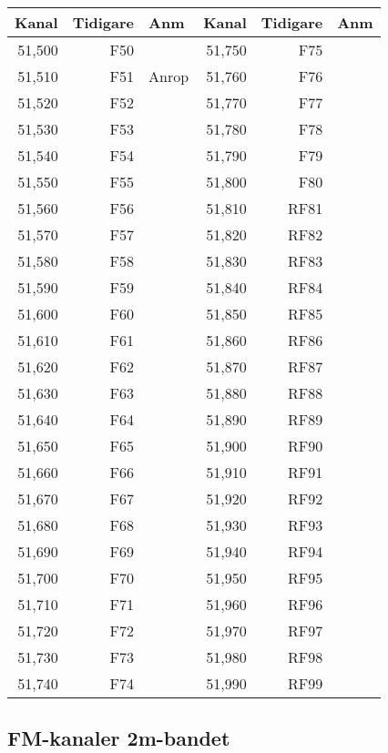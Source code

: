 \begin{longtable}{rrl|rrl}
\textbf{Kanal} & \textbf{Tidigare} & \textbf{Anm}
&  \textbf{Kanal} & \textbf{Tidigare} & \textbf{Anm} \\ \hline
	51,500 &      F50 &       & 51,750 &      F75 &  \\
	51,510 &      F51 & Anrop & 51,760 &      F76 &  \\
	51,520 &      F52 &       & 51,770 &      F77 &  \\
	51,530 &      F53 &       & 51,780 &      F78 &  \\
	51,540 &      F54 &       & 51,790 &      F79 &  \\
	51,550 &      F55 &       & 51,800 &      F80 &  \\
	51,560 &      F56 &       & 51,810 &     RF81 &  \\
	51,570 &      F57 &       & 51,820 &     RF82 &  \\
	51,580 &      F58 &       & 51,830 &     RF83 &  \\
	51,590 &      F59 &       & 51,840 &     RF84 &  \\
	51,600 &      F60 &       & 51,850 &     RF85 &  \\
	51,610 &      F61 &       & 51,860 &     RF86 &  \\
	51,620 &      F62 &       & 51,870 &     RF87 &  \\
	51,630 &      F63 &       & 51,880 &     RF88 &  \\
	51,640 &      F64 &       & 51,890 &     RF89 &  \\
	51,650 &      F65 &       & 51,900 &     RF90 &  \\
	51,660 &      F66 &       & 51,910 &     RF91 &  \\
	51,670 &      F67 &       & 51,920 &     RF92 &  \\
	51,680 &      F68 &       & 51,930 &     RF93 &  \\
	51,690 &      F69 &       & 51,940 &     RF94 &  \\
	51,700 &      F70 &       & 51,950 &     RF95 &  \\
	51,710 &      F71 &       & 51,960 &     RF96 &  \\
	51,720 &      F72 &       & 51,970 &     RF97 &  \\
	51,730 &      F73 &       & 51,980 &     RF98 &  \\
	51,740 &      F74 &       & 51,990 &     RF99 &
\end{longtable}

\subsection{FM-kanaler 2m-bandet}

